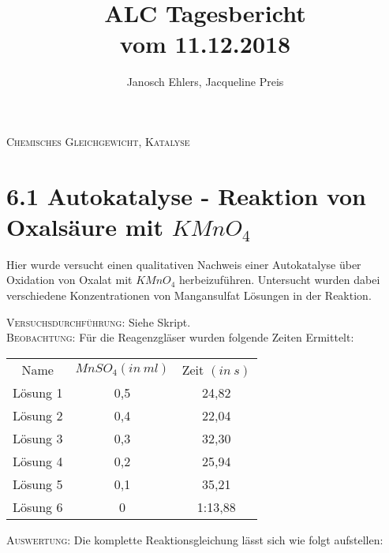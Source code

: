 \documentclass[12pt, a4paper]{article}
\def\1{Lösung 1}
\def\2{Lösung 2}
\def\3{Lösung 3}
\def\4{Lösung 4}
\def\5{Lösung 5}
\def\6{Lösung 6}
\begin{document}
\title{ALC Tagesbericht\\ vom 11.12.2018}
\author{Janosch Ehlers, Jacqueline Preis}
\maketitle

	\begin{center}
	\textsc{Chemisches Gleichgewicht, Katalyse}
	\end{center}

\section{6.1 Autokatalyse - Reaktion von Oxalsäure mit $KMnO_4$}

Hier wurde versucht einen qualitativen Nachweis einer Autokatalyse über Oxidation von Oxalat mit $KMnO_4$ herbeizuführen. Untersucht wurden dabei verschiedene Konzentrationen von Mangansulfat Lösungen in der Reaktion.

\textsc{Versuchsdurchführung:} Siehe Skript.\\

\textsc{Beobachtung:}\hspace{5mm} Für die Reagenzgläser wurden folgende Zeiten Ermittelt: \\
\begin{center}
\begin{tabular}{ccc}
Name & $MnSO_4 (in\ ml)$ & Zeit $(in\ s)$\\
\1 & 0,5 & 24,82\\
\2 & 0,4 & 22,04\\
\3 & 0,3 & 32,30\\
\4 & 0,2 & 25,94\\
\5 & 0,1 & 35,21\\
\6 & 0 & 1:13,88\\
\end{tabular}
\end{center}

\textsc{Auswertung:}\hspace{8mm} Die komplette Reaktionsgleichung lässt sich wie folgt aufstellen:\\
\end{document}
